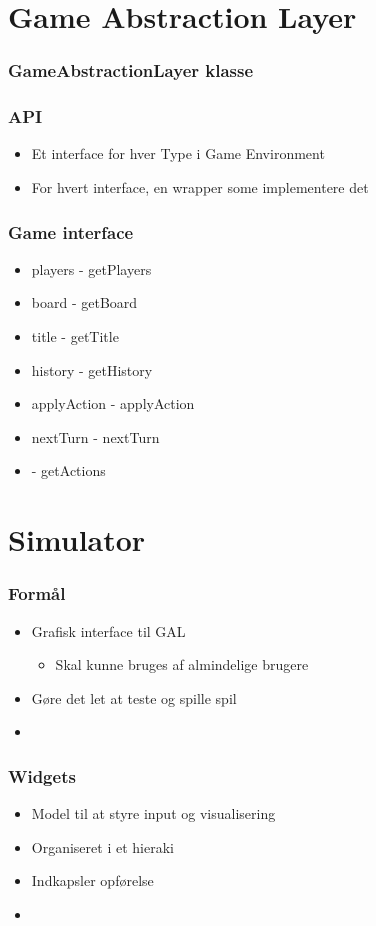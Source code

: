 \section{Game Abstraction Layer}


\begin{frame}
  \frametitle{GameAbstractionLayer klasse}

\end{frame}

\begin{frame}
  \frametitle{API}

  \begin{itemize}
    \item Et interface for hver Type i Game Environment
    \item For hvert interface, en wrapper some implementere det
  \end{itemize}
\end{frame}

\begin{frame}
  \frametitle{Game interface}

  \begin{itemize}
    \item players  - getPlayers
	 \item board	-	getBoard
	 \item title - getTitle
	 \item history - getHistory
	 \item applyAction - applyAction
	 \item nextTurn - nextTurn
	 \item  - getActions
  \end{itemize}
\end{frame}

\section{Simulator}

\begin{frame}
  \frametitle{Formål}

  \begin{itemize}
    \item Grafisk interface til GAL
	   \begin{itemize}
		  \item Skal kunne bruges af almindelige brugere
	   \end{itemize}
	 \item Gøre det let at teste og spille spil
	 \item 
  \end{itemize}
\end{frame}

\begin{frame}
  \frametitle{Widgets}

  \begin{itemize}
    \item Model til at styre input og visualisering
	 \item Organiseret i et hieraki
	 \item Indkapsler opførelse
	 \item 
  \end{itemize}
\end{frame}